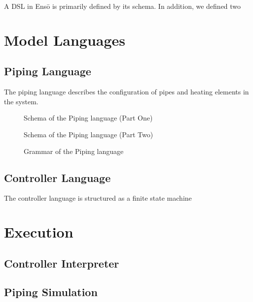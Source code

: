 \documentclass[11pt]{article}
\def\Enso{Ens\={o}\xspace}
\begin{document}
A DSL in \Enso is primarily defined by its schema. In addition, we defined two 

\section{Model Languages}

\subsection{Piping Language}

The piping language describes the configuration of pipes and heating elements in the system. 

\begin{figure}
\caption{Schema of the Piping language (Part One)}
\label{piping-grammar}
\end{figure}
\begin{figure}
\caption{Schema of the Piping language (Part Two)}
\label{piping-grammar}
\end{figure}

\begin{figure}
\caption{Grammar of the Piping language}
\label{piping-grammar}
\end{figure}

\subsection{Controller Language}

The controller language is structured as a finite state machine 

\section{Execution}

\subsection{Controller Interpreter}



\subsection{Piping Simulation}
\end{document}
